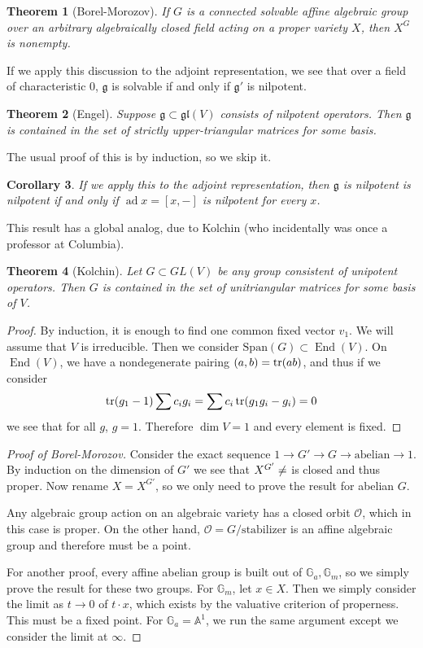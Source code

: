 \documentclass[leqno, openany]{memoir}
\newtheorem{thm}{Theorem}[section]
\newtheorem{cor}[thm]{Corollary}
\theoremstyle{definition}
\theoremstyle{remark}
\theoremstyle{plain}
\theoremstyle{definition}
\theoremstyle{remark}
\newcommand{\A}{\mathbb{A}}
\newcommand{\mc}[1]{\mathcal{#1}}
\newcommand{\mf}[1]{\mathfrak{#1}}
\newcommand{\mr}[1]{\mathrm{#1}}
\DeclareMathOperator{\End}{End}
\DeclareMathOperator{\ad}{ad}
\begin{document}
\begin{thm}[Borel-Morozov]
    If $G$ is a connected solvable affine algebraic group over an arbitrary algebraically closed field acting on a proper variety $X$, then $X^G$ is nonempty.
\end{thm}

If we apply this discussion to the adjoint representation, we see that over a field of characteristic $0$, $\mf{g}$ is solvable if and only if $\mf{g}'$ is nilpotent.

\begin{thm}[Engel]
    Suppose $\mf{g} \subset \mf{gl}(V)$ consists of nilpotent operators. Then $\mf{g}$ is contained in the set of strictly upper-triangular matrices for some basis.
\end{thm}

The usual proof of this is by induction, so we skip it.

\begin{cor}
    If we apply this to the adjoint representation, then $\mf{g}$ is nilpotent is nilpotent if and only if $\ad x = [x,-]$ is nilpotent for every $x$.
\end{cor}

This result has a global analog, due to Kolchin (who incidentally was once a professor at Columbia).

\begin{thm}[Kolchin]
    Let $G \subset GL(V)$ be any group consistent of unipotent operators. Then $G$ is contained in the set of unitriangular matrices for some basis of $V$.
\end{thm}

\begin{proof}
    By induction, it is enough to find one common fixed vector $v_1$. We will assume that $V$ is irreducible. Then we consider $\mr{Span}(G) \subset \End(V)$. On $\End(V)$, we have a nondegenerate pairing $(a,b) = \tr(ab)$, and thus if we consider 
    \[ \tr (g_1-1) \sum c_i g_i = \sum c_i \tr(g_1g_i - g_i) = 0 \]
    we see that for all $g$, $g=1$. Therefore $\dim V = 1$ and every element is fixed.
\end{proof}

\begin{proof}[Proof of Borel-Morozov]
    Consider the exact sequence $1 \to G' \to G \to \text{abelian} \to 1$. By induction on the dimension of $G'$ we see that $X^{G'} \neq \empty$ is closed and thus proper. Now rename $X = X^{G'}$, so we only need to prove the result for abelian $G$.

    Any algebraic group action on an algebraic variety has a closed orbit $\mc{O}$, which in this case is proper. On the other hand, $\mc{O} = G/\text{stabilizer}$ is an affine algebraic group and therefore must be a point.

    For another proof, every affine abelian group is built out of $\mathbb{G}_a, \mathbb{G}_m$, so we simply prove the result for these two groups. For $\mathbb{G}_m$, let $x \in X$. Then we simply consider the limit as $t \to 0$ of $t \cdot x$, which exists by the valuative criterion of properness. This must be a fixed point. For $\mathbb{G}_a = \A^1$, we run the same argument except we consider the limit at $\infty$.
\end{proof}
\end{document}
